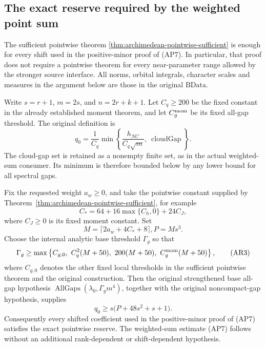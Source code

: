 \subsection{The exact reserve required by the weighted point sum}
\label{sec:archimedean-ap7-reserve}

The sufficient pointwise theorem
\ref{thm:archimedean-pointwise-sufficient} is enough for every
shift used in the positive-minor proof of (AP7).  In particular,
that proof does not require a pointwise theorem for every
near-parameter range allowed by the stronger source interface.
All norms, orbital integrals, character scales and measures in
the argument below are those in the original \(\mathrm{BData}\).

Write \(s=r+1\), \(m=2s\), and \(n=2r+k+1\).  Let
\(C_q\ge200\) be the fixed constant in the already established
moment theorem, and let \(C_g^{\rm mom}\) be its fixed all-gap
threshold.  The original definition is
\[
 q_0=\frac1{C_q}\min\left\{
        \frac{h_{NC}}{C_q\sqrt m},\ \operatorname{cloudGap}\right\}.
                                                        \tag{AR1}
\]
The cloud-gap set is retained as a nonempty finite set, as in
the actual weighted-sum consumer.  Its minimum is therefore
bounded below by any lower bound for all spectral gaps.

\begin{proposition}\label{prop:archimedean-ap7-reserve}
Fix the requested weight \(a_w\ge0\), and take the pointwise
constant supplied by Theorem~\ref{thm:archimedean-pointwise-sufficient},
for example
\[
                 C_*=64+16\max\{C_h,0\}+24C_J,
\]
where \(C_J\ge0\) is its fixed moment constant.  Set
\[
                  M=\lceil2a_w+4C_*+8\rceil,
                      P=Ms^3 .                         \tag{AR2}
\]
Choose the internal analytic base threshold \(\Gamma_g\) so that
\[
 \Gamma_g\ge\max\left\{C_{g,0},\ C_q^2(M+50),\
                   200(M+50),\ C_g^{\rm mom}(M+50)\right\},
                                                        \tag{AR3}
\]
where \(C_{g,0}\) denotes the other fixed local thresholds
in the sufficient pointwise theorem and the original construction.
Then the original strengthened base all-gap hypothesis
\(\operatorname{AllGaps}(\lambda_0,\Gamma_gm^4)\), together with
the original noncompact-gap hypothesis, supplies
\[
       q_0\ge s\bigl(P+48s^2+s+1\bigr).                 \tag{AR4}
\]
Consequently every shifted coefficient used in the positive-minor
proof of (AP7) satisfies the exact pointwise reserve.  The
weighted-sum estimate (AP7) follows without an additional
rank-dependent or shift-dependent hypothesis.
\end{proposition}

